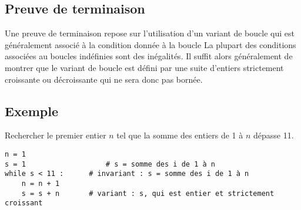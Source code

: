 \subsection{Preuve de terminaison}


\begin{defi}
Une preuve de terminaison repose sur l'utilisation d'un variant de boucle qui est généralement associé à la condition donnée à la boucle  La plupart des conditions associées au boucles indéfinies sont des inégalités. Il suffit alors généralement de montrer que le variant de boucle est défini par une suite d'entiers strictement croissante ou décroissante qui ne sera donc pas bornée.
\end{defi}

\subsection{Exemple}


\begin{exemple}
Rechercher le premier entier $n$ tel que la somme des entiers de 1 à $n$ dépasse 11.

\begin{lstlisting}
n = 1
s = 1           		# s = somme des i de 1 à n
while s < 11 :  	# invariant : s = somme des i de 1 à n
    n = n + 1
    s = s + n   	# variant : s, qui est entier et strictement croissant
\end{lstlisting}
\end{exemple}